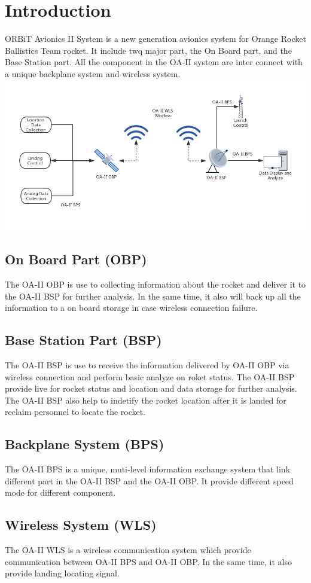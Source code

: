 \documentclass[12pt,article]{memoir}
\begin{document}
\section{Introduction}
ORBiT Avionics II System is a new generation avionics system for Orange Rocket Ballistics Team rocket. It include twq major part, the On Board part, and the Base Station part. All the component in the OA-II system are inter connect with a unique backplane system and wireless system.
\includegraphics[width=\textwidth]{sys_diag.png}
\subsection{On Board Part (OBP)}
The OA-II OBP is use to collecting information about the rocket and deliver it to the OA-II BSP for further analysis. In the same time, it also will back up all the information to a on board storage in case wireless connection failure.
\subsection{Base Station Part (BSP)}
The OA-II BSP is use to receive the information delivered by OA-II OBP via wireless connection and perform basic analyze on roket status. The OA-II BSP provide live for rocket status and location and data storage for further analysis. The OA-II BSP also help to indetify the rocket location after it is landed for reclaim personnel to locate the rocket.
\subsection{Backplane System (BPS)}
The OA-II BPS is a unique, muti-level information exchange system that link different part in the OA-II BSP and the OA-II OBP. It provide different speed mode for different component.
\subsection{Wireless System (WLS)}
The OA-II WLS is a wireless communication system which provide communication between OA-II BPS and OA-II OBP. In the same time, it also provide landing locating signal.
\end{document}
